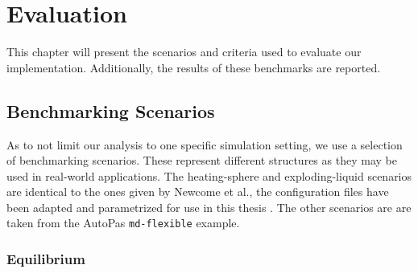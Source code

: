 \chapter[Evaluation]{Evaluation}
\label{cp:evaluation}

{
\parindent0pt
This chapter will present the scenarios and criteria used to evaluate our implementation. Additionally, the results of these benchmarks are reported.
}


\section{Benchmarking Scenarios}
As to not limit our analysis to one specific simulation setting, we use a selection of benchmarking scenarios. These represent different structures as they may be used in real-world applications.
The heating-sphere and exploding-liquid scenarios are identical to the ones given by Newcome et al., the configuration files have been adapted and parametrized for use in this thesis \cite{Newcome2025}.
The other scenarios are are taken from the AutoPas \texttt{md-flexible} example. %


\subsection{Equilibrium}
\label{subsec:equil}


